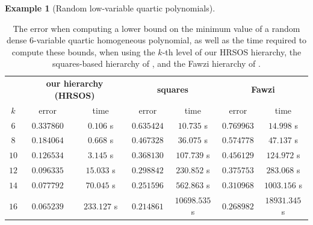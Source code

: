 \documentclass[11pt]{article}
\numberwithin{theorem}{section}
\theoremstyle{definition}
\newtheorem{example}[theorem]{Example}
\begin{document}
\begin{example}[Random low-variable quartic polynomials]
\end{example}

\begin{table}[!htb]
    \begin{center}
        \begin{tabular}{ @{ \ }ccc@{ \qquad }cc@{ \qquad }cc@{ \ } }
            \toprule
            & \multicolumn{2}{c}{\textbf{our hierarchy (HRSOS)}}& \multicolumn{2}{c}{\textbf{squares} \cite{cristancho2024harmonic}} & \multicolumn{2}{c}{\textbf{Fawzi} \cite{cristancho2024harmonic}} \\
            $k$ & error & time & error & time & error & time \\ \midrule
            $6$ & $0.337860$ & $0.106$ s & $0.635424$ & $10.735$ s & $0.769963$ & $14.998$ s\\
$8$ & $0.184064$ & $0.668$ s & $0.467328$ & $36.075$ s & $0.574778$ & $47.137$ s\\
$10$ & $0.126534$ & $3.145$ s & $0.368130$ & $107.739$ s & $0.456129$ & $124.972$ s\\
$12$ & $0.096335$ & $15.033$ s & $0.298842$ & $230.852$ s & $0.375753$ & $283.068$ s\\
$14$ & $0.077792$ & $70.045$ s & $0.251596$ & $562.863$ s & $0.310968$ & $1003.156$ s\\
$16$ & $0.065239$ & $233.127$ s & $0.214861$ & $10698.535$ s & $0.268982$ & $18931.345$ s\\
\bottomrule
        \end{tabular}
        \caption{The error when computing a lower bound on the minimum value of a random dense 6-variable quartic homogeneous polynomial, as well as the time required to compute these bounds, when using the $k$-th level of our HRSOS hierarchy, the squares-based hierarchy of \cite{cristancho2024harmonic}, and the Fawzi hierarchy of \cite{cristancho2024harmonic}.}\label{tab:quartic_numerics}
    \end{center}
\end{table}
\end{document}
